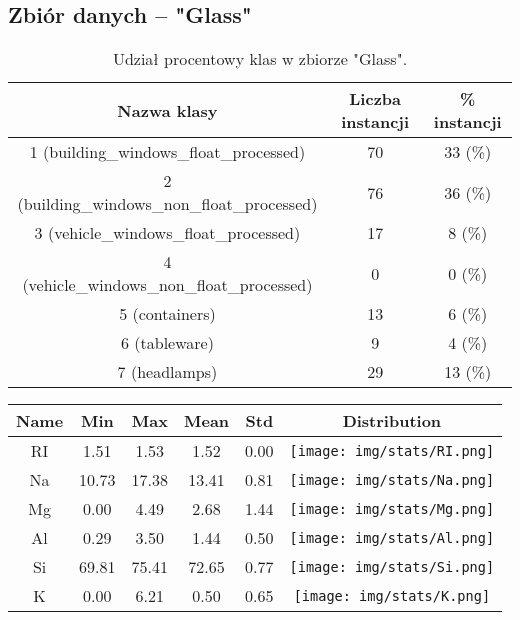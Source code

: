 \subsection{Zbiór danych -- "Glass"}
\begin{table}[H]
  \center
  \begin{tabular}{|c|c|c|} \hline
    Nazwa klasy & Liczba instancji & \% instancji \\ \hline
    1 (building\_windows\_float\_processed)       & 70 & 33 (\%)\\ \hline
    2 (building\_windows\_non\_float\_processed)  & 76 & 36 (\%)\\ \hline
    3 (vehicle\_windows\_float\_processed)        & 17 & 8 (\%)\\ \hline
    4 (vehicle\_windows\_non\_float\_processed)   & 0  & 0  (\%)\\ \hline
    5 (containers)                                & 13 & 6 (\%)\\ \hline
    6 (tableware)                                 & 9  & 4 (\%)\\ \hline
    7 (headlamps)                                 & 29 & 13 (\%)\\ \hline
    
  \end{tabular}
  \caption{Udział procentowy klas w zbiorze "Glass".}
\end{table}

\begin{table}[H]
  \center
  \begin{tabular}{|c|c|c|c|c|c|} \hline
Name &    Min &    Max &   Mean &   Std &        Distribution \\ \hline
  RI &   1.51 &   1.53 &   1.52 &  0.00 &  \texttt{[image: img/stats/RI.png]} \\ \hline
  Na &  10.73 &  17.38 &  13.41 &  0.81 &  \texttt{[image: img/stats/Na.png]} \\ \hline
  Mg &   0.00 &   4.49 &   2.68 &  1.44 &  \texttt{[image: img/stats/Mg.png]} \\ \hline
  Al &   0.29 &   3.50 &   1.44 &  0.50 &  \texttt{[image: img/stats/Al.png]} \\ \hline
  Si &  69.81 &  75.41 &  72.65 &  0.77 &  \texttt{[image: img/stats/Si.png]} \\ \hline
   K &   0.00 &   6.21 &   0.50 &  0.65 &   \texttt{[image: img/stats/K.png]} \\ \hline
\end{tabular}
\end{table}

